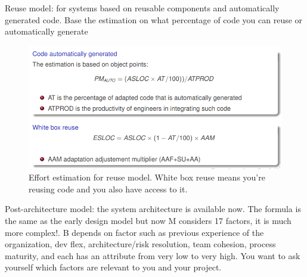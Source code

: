 \noindent Reuse model: for systems based on reusable components and automatically generated code. Base the estimation on what percentage of code you can reuse or automatically generate

\begin{figure} [H]
    \centering
    \includegraphics[width=0.75\linewidth]{Figures//05/cocomo2reuse.png}
    \caption{Effort estimation for reuse model. White box reuse means you're reusing code and you also have access to it.}
\end{figure}

\noindent Post-architecture model: the system architecture is available now. The formula is the same as the early design model but now M considers 17 factors, it is much more complex!. B depends on factor such as previous experience of the organization, dev flex, architecture/risk resolution, team cohesion, process maturity, and each has an attribute from very low to very high. You want to ask yourself which factors are relevant to you and your project.

\noindent 